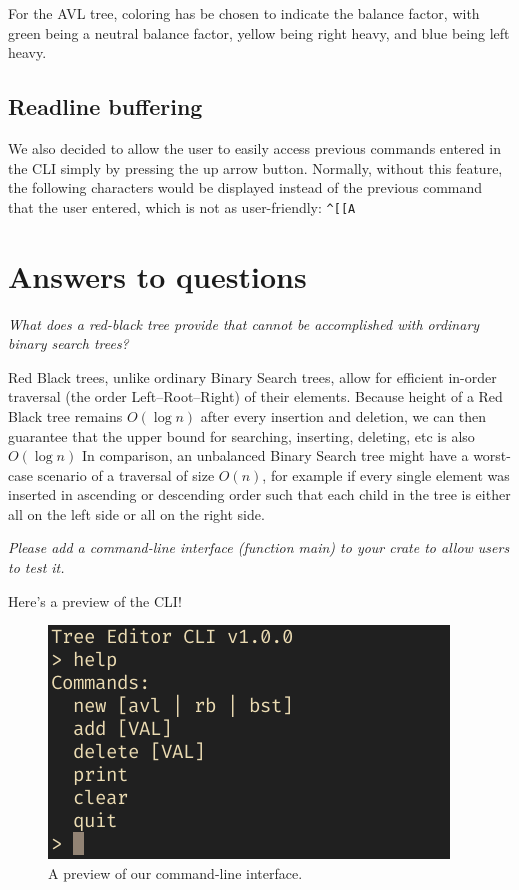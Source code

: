 \documentclass[letterpaper]{article}
\begin{document}
For the AVL tree, coloring has be chosen to indicate the balance
factor, with green being a neutral balance factor, yellow being right
heavy, and blue being left heavy.


\subsection{Readline buffering}
We also decided to allow the user to easily access previous commands entered in
the CLI simply by pressing the up arrow button. Normally, without this feature,
the following characters would be displayed instead of the previous command that
the user entered, which is not as user-friendly:
\verb|^[[A|


\section{Answers to questions}

\textit{What does a red-black tree provide that cannot be accomplished with
ordinary binary search trees?}

Red Black trees, unlike ordinary Binary Search trees, allow for efficient
in-order traversal (the order Left–Root–Right) of their elements.
Because  height of a Red Black tree remains \(O(\log n)\) after every
insertion and deletion, we can then guarantee that the
upper bound for searching, inserting, deleting, etc is also \(O(\log n)\)
In comparison, an unbalanced Binary Search tree might have a worst-case scenario
of a traversal of size \(O(n)\), for example if every single element was
inserted in ascending or descending order such that each child in the tree is
either all on the left side or all on the right side.

\textit{Please add a command-line interface (function main) to your crate to
allow users to test it.}

Here's a preview of the CLI!
\begin{figure}[H]
      \centering
      \includegraphics[width=.8\textwidth]{cli.png}
      \caption{A preview of our command-line interface.}
\end{figure}
\end{document}
